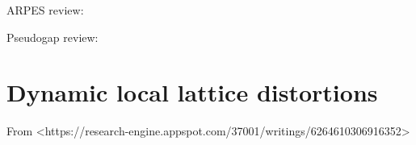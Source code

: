 

ARPES review: \cite{Damascelli2003}

Pseudogap review: \cite{Timusk1999}


\section{Dynamic local lattice distortions}

From <https://research-engine.appspot.com/37001/writings/6264610306916352>

